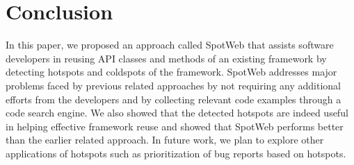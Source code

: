 \section {Conclusion}
\label {sec:conclusion}

In this paper, we proposed an approach called SpotWeb that 
assists software developers in reusing API classes and methods of an existing framework
by detecting hotspots and coldspots of the framework. 
SpotWeb addresses major problems faced by previous 
related approaches by not requiring any additional efforts
from the developers and by collecting relevant code examples through
a code search engine. 
We also showed that the detected hotspots are 
indeed useful in helping effective framework reuse 
and showed that SpotWeb performs better than the earlier related
approach. In future work, we plan to explore other applications
of hotspots such as prioritization of bug reports based on hotspots.
